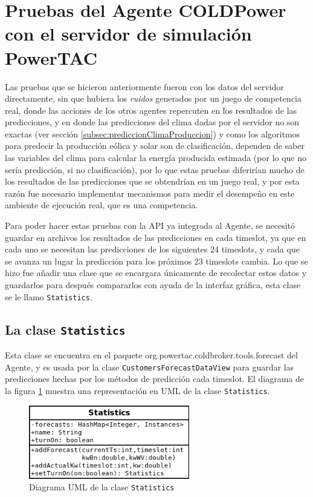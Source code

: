 \section{Pruebas del Agente COLDPower con el servidor de simulación PowerTAC} \label{sec:pruebasBroker}

Las pruebas que se hicieron anteriormente fueron con los datos del servidor directamente, sin que hubiera los \textit{ruidos} generados por un juego de competencia real, donde las acciones de los otros agentes repercuten en los resultados de las predicciones, y en donde las predicciones del clima dadas por el servidor no son exactas (ver sección \ref{subsec:prediccionClimaProduccion}) y como los algoritmos para predecir la producción eólica y solar son de clasificación, dependen de saber las variables del clima para calcular la energía producida estimada (por lo que no sería predicción, si no clasificación), por lo que estas pruebas diferirían mucho de los resultados de las predicciones que se obtendrían en un juego real, y por esta razón fue necesario implementar mecanismos para medir el desempeño en este ambiente de ejecución real, que es una competencia.

Para poder hacer estas pruebas con la API ya integrada al Agente, se necesitó guardar en archivos los resultados de las predicciones en cada timeslot, ya que en cada uno se necesitan las predicciones de los siguientes 24 timeslots, y cada que se avanza un lugar la predicción para los próximos 23 timeslots cambia. Lo que se hizo fue añadir una clase que se encargara únicamente de recolectar estos datos y guardarlos para después compararlos con ayuda de la interfaz gráfica, esta clase se le llamo \texttt{Statistics}.

\subsection{La clase \texttt{Statistics}} \label{subsec:claseStatistics}
Esta clase se encuentra en el paquete org.powertac.coldbroker.tools.forecast del Agente, y es usada por la clase \texttt{CustomersForecastDataView} para guardar las predicciones hechas por los métodos de predicción cada timeslot.
El diagrama de la figura \ref{fig:StatisticsUML} muestra una representación en UML %
de la clase \texttt{Statistics}.

\begin{figure}
	\includegraphics[width=7cm]{img/StatisticsUML.png}
	\caption{Diagrama UML de la clase \texttt{Statistics}}
	\label{fig:StatisticsUML}
\end{figure}


